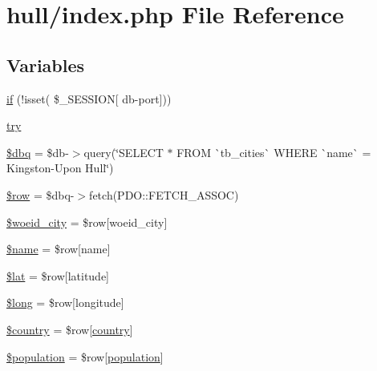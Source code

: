 \hypertarget{hull_2index_8php}{}\section{hull/index.php File Reference}
\label{hull_2index_8php}
\subsection*{Variables}
\begin{DoxyCompactItemize}
\item 
\mbox{\hyperlink{hull_2index_8php_a8f0d8893361d6307986497540738a8bf}{if}} (!isset( \$\+\_\+\+S\+E\+S\+S\+I\+ON\mbox{[} \textquotesingle{}db-\/port\textquotesingle{}\mbox{]}))
\item 
\mbox{\hyperlink{hull_2index_8php_abe4cc9788f52e49485473dc699537388}{try}}
\item 
\mbox{\hyperlink{hull_2index_8php_ab76933014035168a37e7e525ca8fbabe}{\$dbq}} = \$db-\/$>$query(\char`\"{}S\+E\+L\+E\+CT $\ast$ F\+R\+OM \`{}tb\+\_\+cities\`{} W\+H\+E\+RE \`{}name\`{} = \textquotesingle{}Kingston-\/Upon Hull\textquotesingle{}\char`\"{})
\item 
\mbox{\hyperlink{hull_2index_8php_aa1d731aa570613e5bcff831bb10e9b87}{\$row}} = \$dbq-\/$>$fetch(P\+D\+O\+::\+F\+E\+T\+C\+H\+\_\+\+A\+S\+S\+OC)
\item 
\mbox{\hyperlink{hull_2index_8php_a34dc977e0c4838f8c2d423849ad9ff02}{\$woeid\+\_\+city}} = \$row\mbox{[}\textquotesingle{}woeid\+\_\+city\textquotesingle{}\mbox{]}
\item 
\mbox{\hyperlink{hull_2index_8php_ab2fc40d43824ea3e1ce5d86dee0d763b}{\$name}} = \$row\mbox{[}\textquotesingle{}name\textquotesingle{}\mbox{]}
\item 
\mbox{\hyperlink{hull_2index_8php_af498b42b83afed4dfe0af05fd802776c}{\$lat}} = \$row\mbox{[}\textquotesingle{}latitude\textquotesingle{}\mbox{]}
\item 
\mbox{\hyperlink{hull_2index_8php_a30223182013e2964ccbd7c134b3c52c1}{\$long}} = \$row\mbox{[}\textquotesingle{}longitude\textquotesingle{}\mbox{]}
\item 
\mbox{\hyperlink{hull_2index_8php_a1437a5f6eb157f0eb267a26e0ad4f1ba}{\$country}} = \$row\mbox{[}\textquotesingle{}\mbox{\hyperlink{index_8php_a0f0752705301c982dc8994ebc993e6e9}{country}}\textquotesingle{}\mbox{]}
\item 
\mbox{\hyperlink{hull_2index_8php_afc1939ed7d0e8629546e2bc27b02dbc1}{\$population}} = \$row\mbox{[}\textquotesingle{}\mbox{\hyperlink{index_8php_aa78fa356925cd3f67d485c4d6846202b}{population}}\textquotesingle{}\mbox{]}

\end{DoxyCompactItemize}
